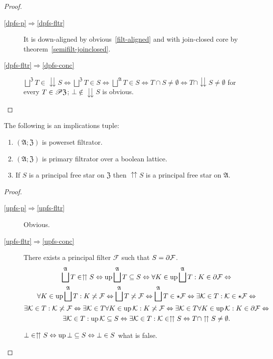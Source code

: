 \begin{proof}
~
\begin{description}
\item [{\ref{dpfs-p}$\Rightarrow$\ref{dpfs-fltr}}] It is down-aligned
by obvious~\ref{filt-aligned} and with join-closed core by theorem~\ref{semifilt-joinclosed}.
\item [{\ref{dpfs-fltr}$\Rightarrow$\ref{dpfs-conc}}] $\bigsqcup^{\mathfrak{Z}}T\in\downdownarrows S\Leftrightarrow\bigsqcup^{\mathfrak{Z}}T\in S\Leftrightarrow\bigsqcup^{\mathfrak{A}}T\in S\Leftrightarrow T\cap S\neq\emptyset\Leftrightarrow T\cap\downdownarrows S\neq\emptyset$
for every $T\in\mathscr{P}\mathfrak{Z}$; $\bot\notin\downdownarrows S$
is obvious.
\end{description}
\end{proof}
\begin{prop}
The following is an implications tuple:
\begin{enumerate}
\item \label{upfs-p}$(\mathfrak{A};\mathfrak{Z})$ is powerset filtrator.
\item \label{upfs-fltr}$(\mathfrak{A};\mathfrak{Z})$ is primary filtrator
over a boolean lattice.
\item \label{upfs-conc}If $S$ is a principal free star on $\mathfrak{Z}$
then $\upuparrows S$ is a principal free star on $\mathfrak{A}$.
\end{enumerate}
\end{prop}
\begin{proof}
~
\begin{description}
\item [{\ref{upfs-p}$\Rightarrow$\ref{upfs-fltr}}] Obvious.
\item [{\ref{upfs-fltr}$\Rightarrow$\ref{upfs-conc}}] There exists a
principal filter $\mathcal{F}$ such that $S=\partial\mathcal{F}$.
\begin{multline*}
\bigsqcup^{\mathfrak{A}}T\in\upuparrows S\Leftrightarrow\operatorname{up}\bigsqcup^{\mathfrak{A}}T\subseteq S\Leftrightarrow\forall K\in\operatorname{up}\bigsqcup^{\mathfrak{A}}T:K\in\partial\mathcal{F}\Leftrightarrow\\
\forall K\in\operatorname{up}\bigsqcup^{\mathfrak{A}}T:K\not\asymp\mathcal{F}\Leftrightarrow\bigsqcup^{\mathfrak{A}}T\not\asymp\mathcal{F}\Leftrightarrow\bigsqcup^{\mathfrak{A}}T\in\star\mathcal{F}\Leftrightarrow\exists\mathcal{K}\in T:\mathcal{K}\in\star\mathcal{F}\Leftrightarrow\\
\exists\mathcal{K}\in T:\mathcal{K}\not\asymp\mathcal{F}\Leftrightarrow\exists\mathcal{K}\in T\forall K\in\operatorname{up}\mathcal{K}:K\not\asymp\mathcal{F}\Leftrightarrow\exists\mathcal{K}\in T\forall K\in\operatorname{up}\mathcal{K}:K\in\partial\mathcal{F}\Leftrightarrow\\
\exists\mathcal{K}\in T:\operatorname{up}\mathcal{K}\subseteq S\Leftrightarrow\exists\mathcal{K}\in T:\mathcal{K}\in\upuparrows S\Leftrightarrow T\cap\upuparrows S\neq\emptyset.
\end{multline*}



$\bot\in\upuparrows S\Leftrightarrow\operatorname{up}\bot\subseteq S\Leftrightarrow\bot\in S$
what is false.

\end{description}
\end{proof}

